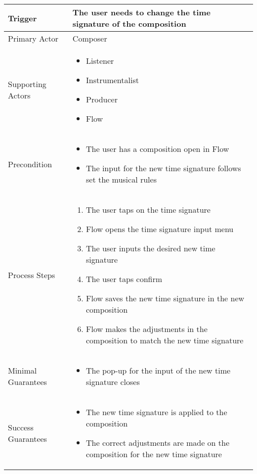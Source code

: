 \begin{longtable}{|X|X|}
\hline
Trigger & 
The user needs to change the time signature of the composition \\
\hline
Primary Actor & 
Composer \\
\hline
Supporting Actors & 
\begin{itemize}
\item Listener
\item Instrumentalist
\item Producer
\item Flow
\end{itemize} \\
\hline
Precondition & 
\begin{itemize}
\item The user has a composition open in Flow
\item The input for the new time signature follows set the musical rules
\end{itemize} \\
\hline
Process Steps & 
\begin{enumerate}
\item The user taps on the time signature
\item Flow opens the time signature input menu
\item The user inputs the desired new time signature
\item The user taps confirm
\item Flow saves the new time signature in the new composition
\item Flow makes the adjustments in the composition to match the new time signature
\end{enumerate} \\
\hline
Minimal Guarantees & 
\begin{itemize}
  \item The pop-up for the input of the new time signature closes
\end{itemize} \\
\hline
Success Guarantees & 
\begin{itemize}
  \item The new time signature is applied to the composition
  \item The correct adjustments are made on the composition for the new time signature
\end{itemize} \\
\hline
\end{longtable}